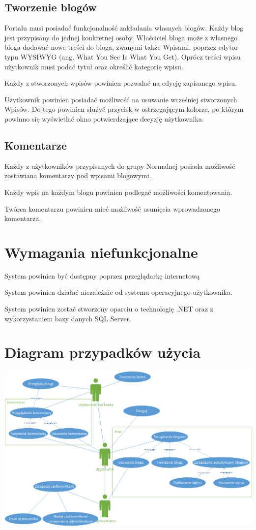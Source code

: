 \documentclass{article}
\begin{document}
\subsection{Tworzenie blogów}
Portalu musi posiadać funkcjonalność zakładania własnych blogów. Każdy blog jest przypisany do jednej konkretnej osoby. Właściciel bloga może z własnego bloga dodawać nowe treści do bloga, zwanymi także Wpisami, poprzez edytor typu WYSIWYG (ang. What You See Is What You Get). Oprócz treści wpisu użytkownik musi podać tytuł oraz określić kategorię wpisu.

Każdy z stworzonych wpisów powinien pozwalać na edycję zapisanego wpisu.

Użytkownik powinien posiadać możliwość na usuwanie wcześniej stworzonych Wpisów. Do tego powinien służyć przycisk w ostrzegającym kolorze, po którym powinno się wyświetlać okno potwierdzające decyzję użytkownika.

\subsection{Komentarze}
Każdy z użytkowników przypisanych do grupy Normalnej posiada możliwość zostawiana komentarzy pod wpisami blogowymi.

Każdy wpis na każdym blogu powinien podlegać możliwości komentowania.

Twórca komentarzu powinien mieć możliwość usunięcia wprowadzonego komentarza.

\section{Wymagania niefunkcjonalne}
System powinien być dostępny poprzez przeglądarkę internetową 

System powinien działać niezależnie od systemu operacyjnego użytkownika.

System powinien zostać stworzony oparciu o technologię .NET oraz z wykorzystaniem bazy danych SQL Server.


\section{Diagram przypadków użycia}
\includegraphics[width=\textwidth]{UseCaseDiagram}
\end{document}
